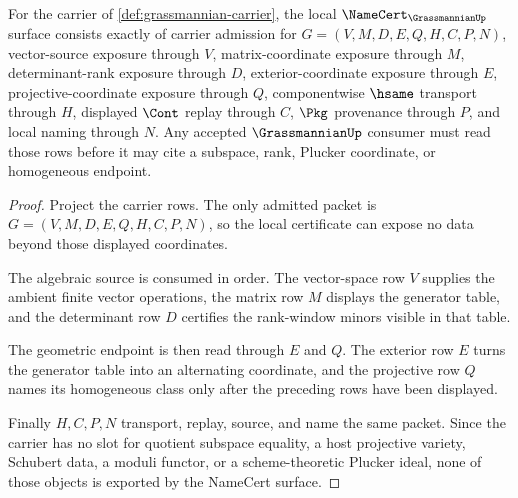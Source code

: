 \begin{theorem}
\label{thm:grassmannian-namecert-obligations}
For the carrier of \autoref{def:grassmannian-carrier}, the local $\NameCert_{\GrassmannianUp}$ surface consists exactly of carrier admission for $G=(V,M,D,E,Q,H,C,P,N)$, vector-source exposure through $V$, matrix-coordinate exposure through $M$, determinant-rank exposure through $D$, exterior-coordinate exposure through $E$, projective-coordinate exposure through $Q$, componentwise $\hsame$ transport through $H$, displayed $\Cont$ replay through $C$, $\Pkg$ provenance through $P$, and local naming through $N$. Any accepted $\GrassmannianUp$ consumer must read those rows before it may cite a subspace, rank, Plucker coordinate, or homogeneous endpoint.
\end{theorem}
\begin{proof}
Project the carrier rows. The only admitted packet is $G=(V,M,D,E,Q,H,C,P,N)$, so the local certificate can expose no data beyond those displayed coordinates.

The algebraic source is consumed in order. The vector-space row $V$ supplies the ambient finite vector operations, the matrix row $M$ displays the generator table, and the determinant row $D$ certifies the rank-window minors visible in that table.

The geometric endpoint is then read through $E$ and $Q$. The exterior row $E$ turns the generator table into an alternating coordinate, and the projective row $Q$ names its homogeneous class only after the preceding rows have been displayed.

Finally $H,C,P,N$ transport, replay, source, and name the same packet. Since the carrier has no slot for quotient subspace equality, a host projective variety, Schubert data, a moduli functor, or a scheme-theoretic Plucker ideal, none of those objects is exported by the NameCert surface.
\end{proof}

